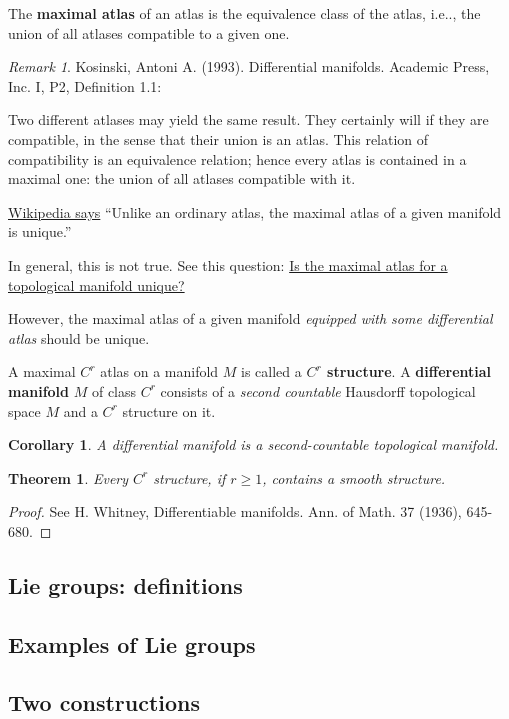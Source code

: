 \documentclass[12pt, letterpaper]{article}
\makeatletter
\newcommand\ie{i.e\@ifnextchar.{}{.\@}}
\newtheorem{cor}[prop]{Corollary}
\newtheorem{thm}[prop]{Theorem}
\theoremstyle{definition}
\theoremstyle{remark}
\newtheorem*{rem*}{Remark}
\theoremstyle{definition}
\theoremstyle{plain}
\numberwithin{equation}{section}
\makeatother
\begin{document}
	\begin{def*}
		The \textbf{maximal atlas} of an atlas is the equivalence class of the atlas,
		\ie, the union of all atlases compatible to a given one.
	\end{def*}
	\begin{rem*}
		Kosinski, Antoni A. (1993). Differential manifolds. Academic Press, Inc. %
		I, P2, Definition 1.1:		
		
		Two different
		atlases may yield the same result. They certainly will if they are compatible,
		in the sense that their union is an atlas. This relation of compatibility is an
		equivalence relation; hence every atlas is contained in a maximal one: the
		union of all atlases compatible with it.
		
		
		\href{https://en.wikipedia.org/wiki/Manifold#Atlases}{Wikipedia says}
		``Unlike an ordinary atlas, the maximal atlas of a given manifold is unique.''
		
		In general, this is not true. See this question:
		\href{https://math.stackexchange.com/questions/2473974/is-the-maximal-atlas-for-a-topological-manifold-unique}
		{Is the maximal atlas for a topological manifold unique?}
		
		However, the maximal atlas of a given manifold \textit{equipped with some differential atlas} should be unique.
	\end{rem*}

	\begin{def*}
		A maximal $C^r$ atlas on a manifold $M$ is called a \textbf{$C^r$ structure}.
		A \textbf{differential manifold}
		$M$ of class $C^r$ consists of a \textit{second countable} Hausdorff topological space $M$ and a
		$C^r$ structure on it.
	\end{def*}
	\begin{cor}
		A differential manifold is a second-countable topological manifold.
	\end{cor}
	
	\begin{thm}
		Every $C^r$ structure, if $r\ge 1$, contains a smooth structure.
	\end{thm}
	\begin{proof}
		See H. Whitney, Differentiable manifolds. Ann. of Math. 37 (1936), 645-680.
	\end{proof}
	
		
	
	\subsection{Lie groups: definitions}
	
	\subsection{Examples of Lie groups}
	
	\subsection{Two constructions}
\end{document}
